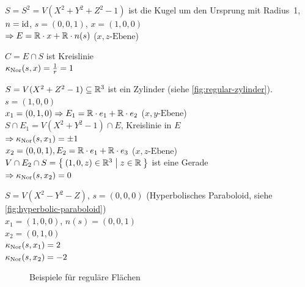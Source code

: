 \begin{beispiel}%
    \begin{bspenum}
        \item $S = S^2 = V(X^2 + Y^2 + Z^2 - 1)$ ist die Kugel um den Ursprung mit Radius~1,
              $n = \textnormal{id}$, $s=(0,0,1)$, $x=(1,0,0)$\\
              $\Rightarrow E = \mathbb{R} \cdot x + \mathbb{R} \cdot n(s)$ ($x,z\text{-Ebene}$)

              $C = E \cap S$ ist Kreislinie\\
              $\kappa_{\textnormal{Nor}}(s, x) = \frac{1}{r} = 1$
        \item $S = V(X^2 + Z^2 - 1) \subseteq \mathbb{R}^3$ ist ein Zylinder (siehe \cref{fig:regular-zylinder}).
              $s = (1,0,0)$\\
              $x_1 = (0,1,0) \Rightarrow E_1 = \mathbb{R} \cdot e_1 + \mathbb{R} \cdot e_2$ ($x,y\text{-Ebene}$)\\
              $S \cap E_1 = V(X^2 + Y^2 - 1) \cap E$, Kreislinie in $E$\\
              $\Rightarrow \kappa_{\textnormal{Nor}}(s, x_1) = \pm 1$\\
              $x_2 = (0, 0, 1), E_2 = \mathbb{R} \cdot e_1 + \mathbb{R} \cdot e_3$ ($x,z\text{-Ebene}$)\\
              $V \cap E_2 \cap S = \Set{(1, 0, z) \in \ensuremath{\mathbb{R}}^3 | z \in \ensuremath{\mathbb{R}}}$ ist eine Gerade\\
              $\Rightarrow \kappa_{\textnormal{Nor}}(s, x_2) = 0$
        \item $S = V(X^2 - Y^2 - Z)$, $s = (0,0,0)$ (Hyperbolisches Paraboloid, siehe \cref{fig:hyperbolic-paraboloid})\\
              $x_1 = (1,0,0)$, $n(s) = (0,0,1)$\\
              $x_2 = (0, 1, 0)$\\
              $\kappa_{\textnormal{Nor}}(s, x_1) = 2$\\
              $\kappa_{\textnormal{Nor}}(s, x_2) = -2$
    \end{bspenum}
\end{beispiel}

\begin{figure}[ht]
    \centering
    \subfloat[$S = V(X^2 + Z^2 - 1)$]{
        \resizebox{0.4\linewidth}{!}{}
        \label{fig:regular-zylinder}
    }%
    \subfloat[$S = V(X^2 - Y^2 - Z)$]{
        \resizebox{0.4\linewidth}{!}{}
        \label{fig:hyperbolic-paraboloid}
    }%
    \label{fig:regular-surfaces}
    \caption{Beispiele für reguläre Flächen}
\end{figure}

